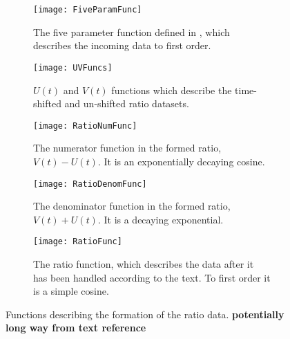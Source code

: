     \begin{figure}
    \centering
        \begin{subfigure}[t]{0.45\textwidth}
            \centering
            \texttt{[image: FiveParamFunc]}
            \caption{The five parameter function defined in , which describes the incoming data to first order.}
        \label{fig:fiveparamfunc}
        \end{subfigure}%

        \vspace{2mm}
        \begin{subfigure}[t]{0.45\textwidth}
            \centering
            \texttt{[image: UVFuncs]}
            \caption{$U(t)$ and $V(t)$ functions which describe the time-shifted and un-shifted ratio datasets.}
        \label{fig:UVfuncs}
        \end{subfigure}
        \hspace{5mm}
        \begin{subfigure}[t]{0.45\textwidth}
            \centering
            \texttt{[image: RatioNumFunc]}
            \caption{The numerator function in the formed ratio, $V(t) - U(t)$. It is an exponentially decaying cosine.}
        \label{fig:rationumfunc}
        \end{subfigure}%
        \vspace{2mm}
        \begin{subfigure}[t]{0.45\textwidth}
            \centering
            \texttt{[image: RatioDenomFunc]}
            \caption{The denominator function in the formed ratio, $V(t) + U(t)$. It is a decaying exponential.}
        \label{fig:ratiodenomfunc}
        \end{subfigure}
        \hspace{5mm}
        \begin{subfigure}[t]{0.45\textwidth}
            \centering
            \texttt{[image: RatioFunc]}
            \caption{The ratio function, which describes the data after it has been handled according to the text. To first order it is a simple cosine.}
        \label{fig:ratiofunc}
        \end{subfigure}%
    \caption[Ratio formation functions]{Functions describing the formation of the ratio data. \textbf{potentially long way from text reference}}
    \label{fig:RatioFormationFunctions}
    \end{figure}


